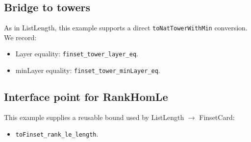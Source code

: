 \subsection{Bridge to towers}
As in ListLength, this example supports a direct \texttt{toNatTowerWithMin} conversion.
We record:
\begin{itemize}
\item Layer equality: \texttt{finset\_tower\_layer\_eq}.
\item minLayer equality: \texttt{finset\_tower\_minLayer\_eq}.
\end{itemize}

\subsection{Interface point for RankHomLe}
This example supplies a reusable bound used by ListLength $\to$ FinsetCard:
\begin{itemize}
\item \texttt{toFinset\_rank\_le\_length}.
\end{itemize}
